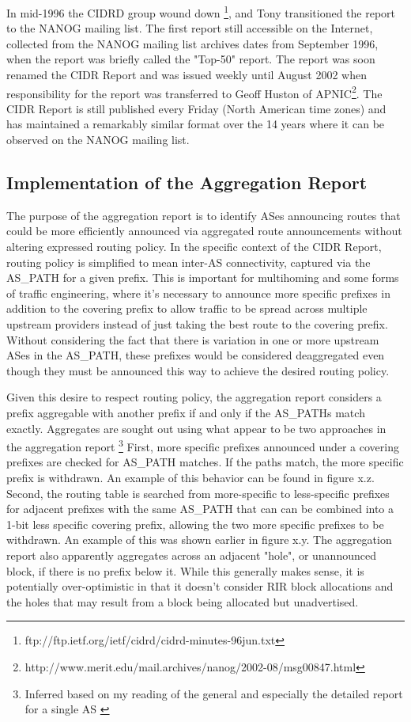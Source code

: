 In mid-1996 the CIDRD group wound down \footnote{ftp://ftp.ietf.org/ietf/cidrd/cidrd-minutes-96jun.txt}, and Tony transitioned the report to the NANOG mailing list. The first report still accessible on the Internet, collected from the NANOG mailing list archives \cite{NANOG} dates from September 1996, when the report was briefly called the "Top-50" report. The report was soon renamed the CIDR Report and was issued weekly until August 2002 when responsibility for the report was transferred to Geoff Huston of APNIC\footnote{http://www.merit.edu/mail.archives/nanog/2002-08/msg00847.html}. The CIDR Report is still published every Friday (North American time zones) and has maintained a remarkably similar format over the 14 years where it can be observed on the NANOG mailing list.

\subsection{Implementation of the Aggregation Report}

The purpose of the aggregation report is to identify ASes announcing routes that could be more efficiently announced via aggregated route announcements without altering expressed routing policy. In the specific context of the CIDR Report, routing policy is simplified to mean inter-AS connectivity, captured via the AS\_PATH for a given prefix. This is important for multihoming and some forms of traffic engineering, where it's necessary to announce more specific prefixes in addition to the covering prefix to allow traffic to be spread across multiple upstream providers instead of just taking the best route to the covering prefix. Without considering the fact that there is variation in one or more upstream ASes in the AS\_PATH, these prefixes would be considered deaggregated even though they must be announced this way to achieve the desired routing policy.

Given this desire to respect routing policy, the aggregation report considers a prefix aggregable with another prefix if and only if the AS\_PATHs match exactly. Aggregates are sought out using what appear to be two approaches in the aggregation report \footnote{Inferred based on my reading of the general and especially the detailed report for a single AS \cite{cidr-report-details}} First, more specific prefixes announced under a covering prefixes are checked for AS\_PATH matches. If the paths match, the more specific prefix is withdrawn. An example of this behavior can be found in figure x.z. Second, the routing table is searched from more-specific to less-specific prefixes for adjacent prefixes with the same AS\_PATH that can can be combined into a 1-bit less specific covering prefix, allowing the two more specific prefixes to be withdrawn. An example of this was shown earlier in figure x.y. The aggregation report also apparently aggregates across an adjacent "hole", or unannounced block, if there is no prefix below it. While this generally makes sense, it is potentially over-optimistic in that it doesn't consider RIR block allocations and the holes that may result from a block being allocated but unadvertised.

